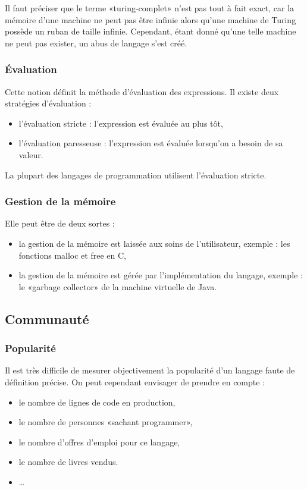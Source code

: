 Il faut préciser que le terme «turing-complet» n'est pas tout à fait exact, car la mémoire d'une machine ne peut pas être infinie alors qu'une machine de Turing possède un ruban de taille infinie. Cependant, étant donné qu'une telle machine ne peut pas exister, un abus de langage s'est créé.

\subsubsection{Évaluation}
\label{evaluation}

Cette notion définit la méthode d'évaluation des expressions. Il existe deux stratégies d'évaluation :
\begin{itemize}
\item l'évaluation stricte : l'expression est évaluée au plus tôt,
\item l'évaluation paresseuse : l'expression est évaluée lorsqu'on a besoin de sa valeur.\\
\end{itemize}

La plupart des langages de programmation utilisent l'évaluation stricte.

\subsubsection{Gestion de la mémoire}
\label{memoire}

Elle peut être de deux sortes :
\begin{itemize}
\item la gestion de la mémoire est laissée aux soins de l'utilisateur, exemple : les fonctions malloc et free en C,
\item la gestion de la mémoire est gérée par l'implémentation du langage, exemple : le «garbage collector» de la machine virtuelle de Java.
\end{itemize}

\subsection{Communauté}
\label{communaute}

\subsubsection{Popularité}
\label{popularite}

Il est très difficile de mesurer objectivement la popularité d'un langage faute de définition précise. On peut cependant envisager de prendre en compte :
\begin{itemize}
\item le nombre de lignes de code en production,
\item le nombre de personnes «sachant programmer»,
\item le nombre d'offres d'emploi pour ce langage,
\item le nombre de livres vendus.
\item …\\
\end{itemize}

